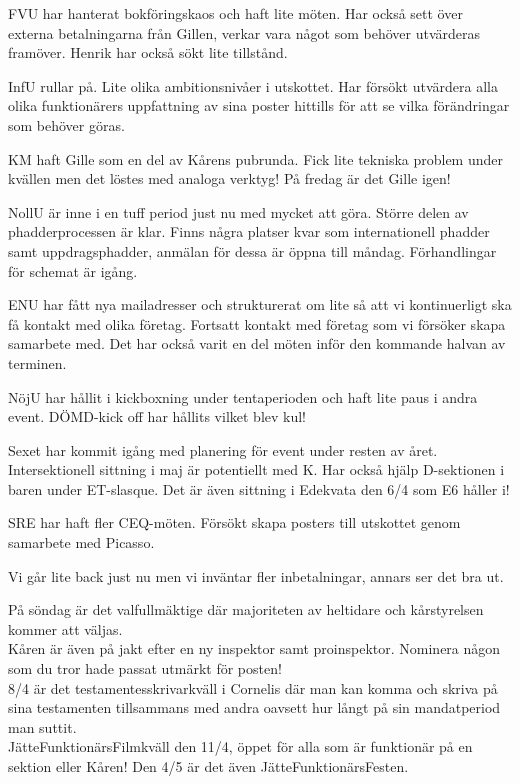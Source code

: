 \documentclass[10pt]{article}
\begin{document}
\begin{paragrafer}
\begin{paragrafer}
FVU har hanterat bokföringskaos och haft lite möten. Har också sett över externa betalningarna från Gillen, verkar vara något som behöver utvärderas framöver. Henrik har också sökt lite tillstånd.

InfU rullar på. Lite olika ambitionsnivåer i utskottet. Har försökt utvärdera alla olika funktionärers uppfattning av sina poster hittills för att se vilka förändringar som behöver göras. 

KM haft Gille som en del av Kårens pubrunda. Fick lite tekniska problem under kvällen men det löstes med analoga verktyg! På fredag är det Gille igen!

NollU är inne i en tuff period just nu med mycket att göra. Större delen av phadderprocessen är klar. Finns några platser kvar som internationell phadder samt uppdragsphadder, anmälan för dessa är öppna till måndag. Förhandlingar för schemat är igång.

ENU har fått nya mailadresser och strukturerat om lite så att vi kontinuerligt ska få kontakt med olika företag. Fortsatt kontakt med företag som vi försöker skapa samarbete med. Det har också varit en del möten inför den kommande halvan av terminen.

NöjU har hållit i kickboxning under tentaperioden och haft lite paus i andra event. DÖMD-kick off har hållits vilket blev kul!

Sexet har kommit igång med planering för event under resten av året. Intersektionell sittning i maj är potentiellt med K. Har också hjälp D-sektionen i baren under ET-slasque. Det är även sittning i Edekvata den 6/4 som E6 håller i!

SRE har haft fler CEQ-möten. Försökt skapa posters till utskottet genom samarbete med Picasso.

Vi går lite back just nu men vi inväntar fler inbetalningar, annars ser det bra ut.

På söndag är det valfullmäktige där majoriteten av heltidare och kårstyrelsen kommer att väljas. \\
Kåren är även på jakt efter en ny inspektor samt proinspektor. Nominera någon som du tror hade passat utmärkt för posten!\\
8/4 är det testamentesskrivarkväll i Cornelis där man kan komma och skriva på sina testamenten tillsammans med andra oavsett hur långt på sin mandatperiod man suttit.\\
JätteFunktionärsFilmkväll den 11/4, öppet för alla som är funktionär på en sektion eller Kåren!
Den 4/5 är det även JätteFunktionärsFesten.



\end{paragrafer}
\end{paragrafer}
\end{document}
